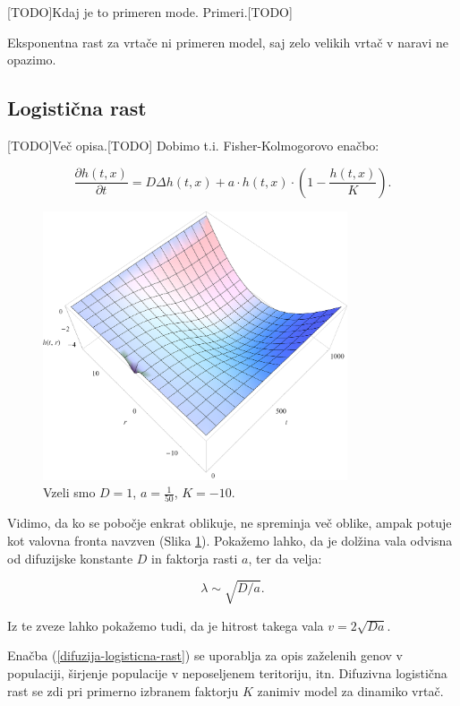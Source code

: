\documentclass[a4paper, twoside, 12pt]{book}
\begin{document}
[TODO]Kdaj je to primeren mode. Primeri.[TODO]

Eksponentna rast za vrtače ni primeren model, saj zelo velikih vrtač v naravi ne opazimo.

    \subsection{Logistična rast}
[TODO]Več opisa.[TODO]
    Dobimo t.i. Fisher-Kolmogorovo enačbo:

    \begin{equation}
      \frac{ \partial h(t,x) }{ \partial t} = D \Delta h(t,x) + a \cdot h(t,x) \cdot (1 - \frac{h(t,x)}{K}).
      \label{difuzija-logisticna-rast}
    \end{equation}
    \begin{figure}[h!]
      \begin{center}
        \includegraphics[width=9cm]{slike/difuzija-logisticna-rast2}
      \end{center}
      \caption{Vzeli smo $D=1$, $a=\frac{1}{50}$, $K=-10$.}
      \label{fig:difuzija-logisticna-rast}
    \end{figure}

    Vidimo, da ko se pobočje enkrat oblikuje, ne spreminja več oblike, ampak potuje kot valovna fronta navzven (Slika \ref{fig:difuzija-logisticna-rast}). Pokažemo lahko, da je dolžina vala odvisna od difuzijske konstante $D$ in faktorja rasti $a$, ter da velja: 

    \[ \lambda \sim \sqrt{D/a}. \]

    Iz te zveze lahko pokažemo tudi, da je hitrost takega vala $v = 2 \sqrt{D a}$.

    Enačba (\ref{difuzija-logisticna-rast}) se uporablja za opis zaželenih genov v populaciji, širjenje populacije v neposeljenem teritoriju, itn.
    Difuzivna logistična rast se zdi pri primerno izbranem faktorju $K$ zanimiv model za dinamiko vrtač.
\end{document}
